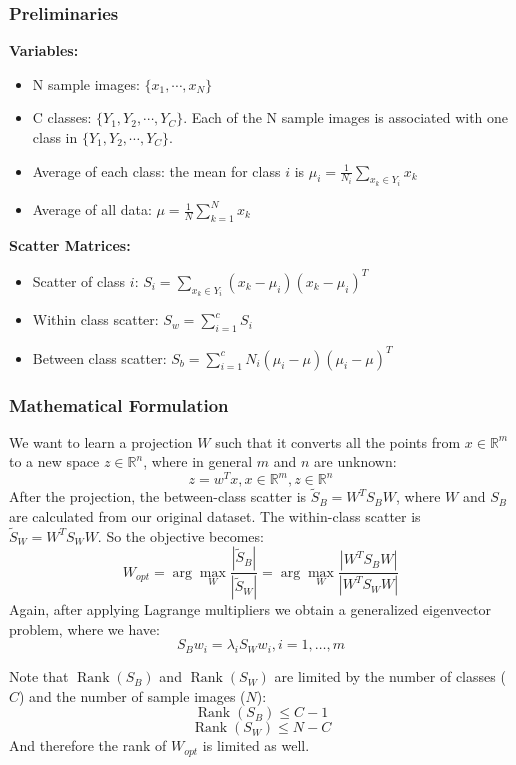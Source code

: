 \documentclass{article}
\newcommand{\argmax}{\arg\!\max}
\DeclareMathOperator{\Rank}{Rank}
\begin{document}
\subsubsection{Preliminaries}
\textbf{Variables:}
\begin{itemize}
	\item N sample images: $\{x_1, \cdots, x_N\}$
    \item C classes: $\{Y_1, Y_2, \cdots, Y_C\}$. Each of the N sample images is associated with one class in $\{Y_1, Y_2, \cdots, Y_C\}$.
    \item Average of each class: the mean for class $i$ is $\mu_i = \frac{1}{N_i} \displaystyle\sum_{x_k \in Y_i}x_k$ 
    \item Average of all data: $\mu = \frac{1}{N} \displaystyle\sum_{k=1}^{N}x_k$
\end{itemize}
\textbf{Scatter Matrices:}
\begin{itemize}
	\item Scatter of class $i$: $S_i = \displaystyle\sum_{x_k \in Y_i} (x_k - \mu_i)(x_k - \mu_i)^T$
    \item Within class scatter: $S_w = \displaystyle\sum_{i=1}^{c} S_i$
    \item Between class scatter: $S_b = \displaystyle\sum_{i=1}^{c} N_i(\mu_i-\mu)(\mu_i-\mu)^T$
\end{itemize}

\subsubsection{Mathematical Formulation}
We want to learn a projection $W$ such that it converts all the points from $x\in \mathbb{R}^m$ to a new space $z\in \mathbb{R}^n$, where in general $m$ and $n$ are unknown:
$$z = w^Tx, x\in \mathbb{R}^m, z\in \mathbb{R}^n$$
After the projection, the between-class scatter is $\widetilde{S}_B = W^TS_BW$, where $W$ and $S_B$ are calculated from our original dataset. The within-class scatter is $\widetilde{S}_W = W^TS_WW$. So the objective becomes: 
$$W_{opt} = \argmax_W \frac{\left|\widetilde{S}_B\right|}{\left|\widetilde{S}_W\right|} = \argmax_W \frac{\left|W^TS_BW\right|}{\left|W^TS_WW\right|}$$
Again, after applying Lagrange multipliers we obtain a generalized eigenvector problem, where we have:
$$S_B w_i = \lambda_iS_Ww_i, i = 1, \dots, m$$

Note that $\Rank(S_B)$ and $\Rank(S_W)$ are limited by the number of classes ($C$) and the number of sample images ($N$):
$$\Rank(S_B) \leq C-1$$
$$\Rank(S_W) \leq N-C$$
And therefore the rank of $W_{opt}$ is limited as well.
\end{document}
